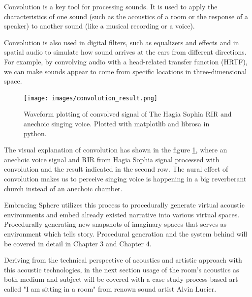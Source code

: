             Convolution is a key tool for processing sounds. It is used to apply the characteristics of one sound (such as the acoustics of a room or the response of a speaker) to another sound (like a musical recording or a voice).\par

            Convolution is also used in digital filters, such as equalizers and effects and in spatial audio to simulate how sound arrives at the ears from different directions. For example, by convolving audio with a head-related transfer function (HRTF), we can make sounds appear to come from specific locations in three-dimensional space\cite{3D_Audio}.\par

            \begin{figure}[H]
                \centering
                \texttt{[image: images/convolution\_result.png]}
                \caption{Waveform plotting of convolved signal of The Hagia Sophia RIR and anechoic singing voice. Plotted with matplotlib and librosa in python.}
                \label{fig:CONV_RESULT}
            \end{figure}
            
            The visual explanation of convolution has shown in the figure \ref{fig:CONV_RESULT}, where an anechoic voice signal and RIR from Hagia Sophia signal processed with convolution and the result indicated in the second row. The aural effect of convolution makes us to perceive singing voice is happening in a big reverberant church instead of an anechoic chamber.\par

            Embracing Sphere utilizes this process to procedurally generate virtual acoustic environments and embed already existed narrative into various virtual spaces. Procedurally generating new snapshots of imaginary spaces that serves as environment which tells story. Procedural generation and the system behind will be covered in detail in Chapter 3 and Chapter 4.\par

            Deriving from the technical perspective of acoustics and artistic approach with this acoustic technologies, in the next section usage of the room's acoustics as both medium and subject will be covered with a case study process-based art called "I am sitting in a room" from renown sound artist Alvin Lucier.\par
